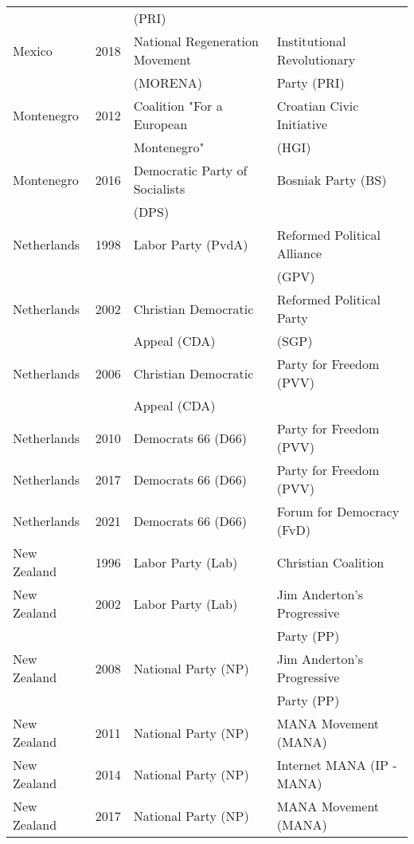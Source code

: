 {\begin{longtable}{|l|c|l|l|}
               &      &    (PRI)     &     \\ 
  Mexico & 2018 &   National Regeneration Movement &   Institutional Revolutionary \\ 
               &      &        (MORENA)  &   Party (PRI)   \\ 
  Montenegro & 2012 &   Coalition "For a European    &   Croatian Civic Initiative \\ 
               &      &        Montenegro" &     (HGI) \\ 
  Montenegro & 2016 &   Democratic Party of Socialists &   Bosniak Party (BS) \\ 
               &      &     (DPS)     &     \\ 
   Netherlands & 1998 &   Labor Party (PvdA) &   Reformed Political Alliance  \\ 
               &      &         &    (GPV) \\ 
  Netherlands & 2002 &   Christian Democratic &   Reformed Political Party  \\ 
               &      &     Appeal (CDA)     &   (SGP)  \\ 
  Netherlands & 2006 &   Christian Democratic  &   Party for Freedom (PVV) \\ 
               &      &       Appeal (CDA)  &     \\ 
  Netherlands & 2010 &   Democrats 66 (D66) &   Party for Freedom (PVV) \\ 
  Netherlands & 2017 &   Democrats 66 (D66) &   Party for Freedom (PVV) \\ 
  Netherlands & 2021 &   Democrats 66 (D66) &   Forum for Democracy (FvD) \\ 
   New Zealand & 1996 &   Labor Party (Lab) &   Christian Coalition \\ 
   New Zealand & 2002 &   Labor Party (Lab) &   Jim Anderton's Progressive   \\ 
               &      &         &    Party (PP)  \\ 
   New Zealand & 2008 &   National Party (NP) &   Jim Anderton's Progressive  \\ 
               &      &         &   Party (PP)    \\ 
   New Zealand & 2011 &   National Party (NP) &   MANA Movement (MANA) \\ 
  New Zealand & 2014 &   National Party (NP) &   Internet MANA (IP - MANA)   \\ 
   New Zealand & 2017 &   National Party (NP) &   MANA Movement (MANA) \\ 

\end{longtable}}
